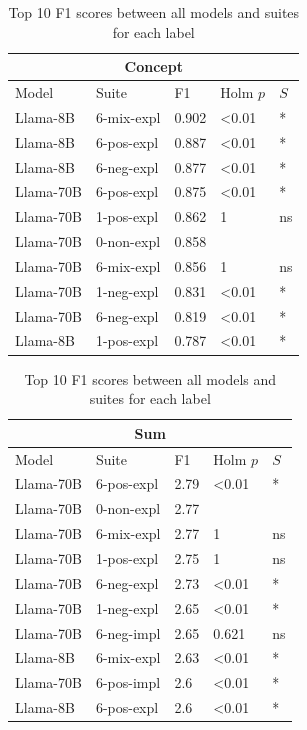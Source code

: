 \begin{table}
\begin{tabular}{ll|lll}
\toprule
\multicolumn{5}{c}{\textbf{Concept}} \\
\midrule
Model & Suite & F1 & Holm $p$ & $S$ \\
\midrule
Llama-8B & 6-mix-expl & 0.902 & <0.01 & * \\
Llama-8B & 6-pos-expl & 0.887 & <0.01 & * \\
Llama-8B & 6-neg-expl & 0.877 & <0.01 & * \\
Llama-70B & 6-pos-expl & 0.875 & <0.01 & * \\
Llama-70B & 1-pos-expl & 0.862 & 1 & ns \\
Llama-70B & 0-non-expl & 0.858 &  &  \\
Llama-70B & 6-mix-expl & 0.856 & 1 & ns \\
Llama-70B & 1-neg-expl & 0.831 & <0.01 & * \\
Llama-70B & 6-neg-expl & 0.819 & <0.01 & * \\
Llama-8B & 1-pos-expl & 0.787 & <0.01 & * \\
\bottomrule
\end{tabular}
\begin{tabular}{ll|lll}
\toprule
\multicolumn{5}{c}{\textbf{Sum}} \\
\midrule
Model & Suite & F1 & Holm $p$ & $S$ \\
\midrule
Llama-70B & 6-pos-expl & 2.79 & <0.01 & * \\
Llama-70B & 0-non-expl & 2.77 &  &  \\
Llama-70B & 6-mix-expl & 2.77 & 1 & ns \\
Llama-70B & 1-pos-expl & 2.75 & 1 & ns \\
Llama-70B & 6-neg-expl & 2.73 & <0.01 & * \\
Llama-70B & 1-neg-expl & 2.65 & <0.01 & * \\
Llama-70B & 6-neg-impl & 2.65 & 0.621 & ns \\
Llama-8B & 6-mix-expl & 2.63 & <0.01 & * \\
Llama-70B & 6-pos-impl & 2.6 & <0.01 & * \\
Llama-8B & 6-pos-expl & 2.6 & <0.01 & * \\
\bottomrule
\end{tabular}

    \caption{Top 10 F1 scores between all models and suites for each label}
    \label{tab:top10s}
\end{table}